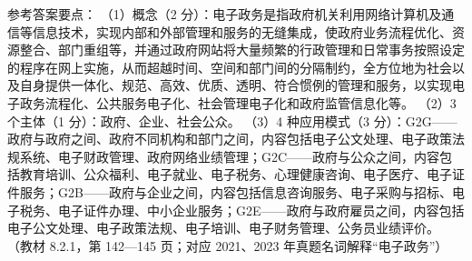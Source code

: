 \documentclass[a4paper,11pt]{article}
\begin{document}
\q 参考答案要点：
（1）概念（2 分）：电子政务是指政府机关利用网络计算机及通信等信息技术，实现内部和外部管理和服务的无缝集成，使政府业务流程优化、资源整合、部门重组等，并通过政府网站将大量频繁的行政管理和日常事务按照设定的程序在网上实施，从而超越时间、空间和部门间的分隔制约，全方位地为社会以及自身提供一体化、规范、高效、优质、透明、符合惯例的管理和服务，以实现电子政务流程化、公共服务电子化、社会管理电子化和政府监管信息化等。
（2）3 个主体（1 分）：政府、企业、社会公众。
（3）4 种应用模式（3 分）：G2G——政府与政府之间、政府不同机构和部门之间，内容包括电子公文处理、电子政策法规系统、电子财政管理、政府网络业绩管理；G2C——政府与公众之间，内容包括教育培训、公众福利、电子就业、电子税务、心理健康咨询、电子医疗、电子证件服务；G2B——政府与企业之间，内容包括信息咨询服务、电子采购与招标、电子税务、电子证件办理、中小企业服务；G2E——政府与政府雇员之间，内容包括电子公文处理、电子政策法规、电子培训、电子财务管理、公务员业绩评价。
（教材 8.2.1，第 142—145 页；对应 2021、2023 年真题名词解释“电子政务”）

\end{document}
